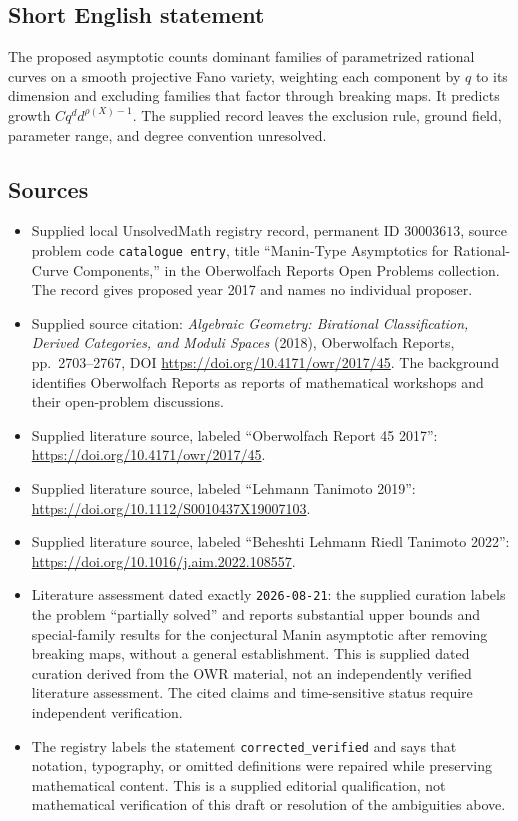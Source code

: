 \documentclass[11pt]{article}
\begin{document}
\subsection{Short English statement}
The proposed asymptotic counts dominant families of parametrized rational curves on a smooth projective Fano variety, weighting each component by \(q\) to its dimension and excluding families that factor through breaking maps. It predicts growth \(Cq^d d^{\rho(X)-1}\). The supplied record leaves the exclusion rule, ground field, parameter range, and degree convention unresolved.
\subsection{Sources}
\begin{itemize}
\item Supplied local UnsolvedMath registry record, permanent ID \(30003613\), source problem code \texttt{catalogue entry}, title ``Manin-Type Asymptotics for Rational-Curve Components,'' in the Oberwolfach Reports Open Problems collection. The record gives proposed year 2017 and names no individual proposer.
\item Supplied source citation: \emph{Algebraic Geometry: Birational Classification, Derived Categories, and Moduli Spaces} (2018), Oberwolfach Reports, pp.\ 2703--2767, DOI \url{https://doi.org/10.4171/owr/2017/45}. The background identifies Oberwolfach Reports as reports of mathematical workshops and their open-problem discussions.
\item Supplied literature source, labeled ``Oberwolfach Report 45 2017'': \url{https://doi.org/10.4171/owr/2017/45}.
\item Supplied literature source, labeled ``Lehmann Tanimoto 2019'': \url{https://doi.org/10.1112/S0010437X19007103}.
\item Supplied literature source, labeled ``Beheshti Lehmann Riedl Tanimoto 2022'': \url{https://doi.org/10.1016/j.aim.2022.108557}.
\item Literature assessment dated exactly \texttt{2026-08-21}: the supplied curation labels the problem ``partially solved'' and reports substantial upper bounds and special-family results for the conjectural Manin asymptotic after removing breaking maps, without a general establishment. This is supplied dated curation derived from the OWR material, not an independently verified literature assessment. The cited claims and time-sensitive status require independent verification.
\item The registry labels the statement \texttt{corrected\_verified} and says that notation, typography, or omitted definitions were repaired while preserving mathematical content. This is a supplied editorial qualification, not mathematical verification of this draft or resolution of the ambiguities above.
\end{itemize}
\end{document}
